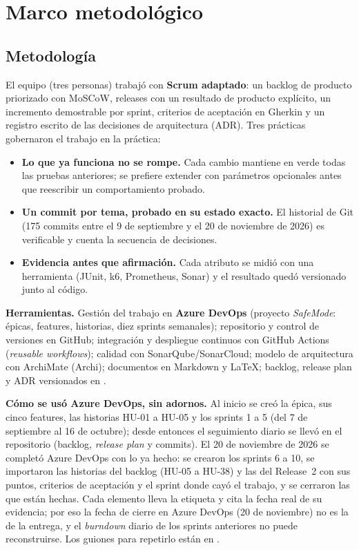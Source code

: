 \chapter{Marco metodológico}

\section{Metodología}\label{sec:azure}
El equipo (tres personas) trabajó con \textbf{Scrum adaptado}: un backlog de producto priorizado con MoSCoW, releases con un resultado de producto
explícito, un incremento demostrable por sprint, criterios de aceptación en Gherkin y un registro escrito de las decisiones de arquitectura
(ADR). Tres prácticas gobernaron el trabajo en la práctica:

\begin{itemize}
  \item \textbf{Lo que ya funciona no se rompe.} Cada cambio mantiene en verde todas las pruebas anteriores; se prefiere extender con
  parámetros opcionales antes que reescribir un comportamiento probado.
  \item \textbf{Un commit por tema, probado en su estado exacto.} El historial de Git (175 commits entre el 9 de septiembre y el 20 de
  noviembre de 2026) es verificable y cuenta la secuencia de decisiones.
  \item \textbf{Evidencia antes que afirmación.} Cada atributo se midió con una herramienta (JUnit, k6, Prometheus, Sonar) y el resultado
  quedó versionado junto al código.
\end{itemize}

\textbf{Herramientas.} Gestión del trabajo en \textbf{Azure DevOps} (proyecto \emph{SafeMode}: épicas, features, historias, diez sprints semanales);
repositorio y control de versiones en GitHub; integración y despliegue continuos con GitHub Actions
(\emph{reusable workflows}); calidad con SonarQube/SonarCloud; modelo de arquitectura con ArchiMate (Archi); documentos en Markdown y
LaTeX; backlog, release plan y ADR versionados en .

\textbf{Cómo se usó Azure DevOps, sin adornos.} Al inicio se creó la épica, sus cinco features, las historias HU-01 a HU-05 y los sprints 1 a 5 (del
7 de septiembre al 16 de octubre); desde entonces el seguimiento diario se llevó en el repositorio (backlog, \emph{release plan} y commits). El 20 de
noviembre de 2026 se completó Azure DevOps con lo ya hecho: se crearon los sprints 6 a 10, se importaron las historias del backlog (HU-05 a HU-38) y las
del Release~2 con sus puntos, criterios de aceptación y el sprint donde cayó el trabajo, y se cerraron las que están hechas. Cada elemento lleva la
etiqueta  y cita la fecha real de su evidencia; por eso la fecha de cierre en Azure DevOps (20 de noviembre) no es la de la
entrega, y el \emph{burndown} diario de los sprints anteriores no puede reconstruirse. Los guiones para repetirlo están en .

